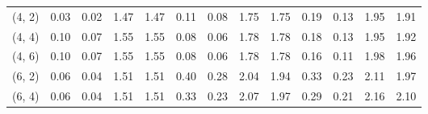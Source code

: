 \begin{tabular}{lrrrrrrrrrrrr}
(4, 2)        &                                               0.03 &                                            0.02 &                            1.47 &                                  1.47 &                                               0.11 &                                            0.08 &                            1.75 &                                  1.75 &                                               0.19 &                                            0.13 &                            1.95 &                                  1.91 \\
(4, 4)        &                                               0.10 &                                            0.07 &                            1.55 &                                  1.55 &                                               0.08 &                                            0.06 &                            1.78 &                                  1.78 &                                               0.18 &                                            0.13 &                            1.95 &                                  1.92 \\
(4, 6)        &                                               0.10 &                                            0.07 &                            1.55 &                                  1.55 &                                               0.08 &                                            0.06 &                            1.78 &                                  1.78 &                                               0.16 &                                            0.11 &                            1.98 &                                  1.96 \\
(6, 2)        &                                               0.06 &                                            0.04 &                            1.51 &                                  1.51 &                                               0.40 &                                            0.28 &                            2.04 &                                  1.94 &                                               0.33 &                                            0.23 &                            2.11 &                                  1.97 \\
(6, 4)        &                                               0.06 &                                            0.04 &                            1.51 &                                  1.51 &                                               0.33 &                                            0.23 &                            2.07 &                                  1.97 &                                               0.29 &                                            0.21 &                            2.16 &                                  2.10 \\

\end{tabular}
